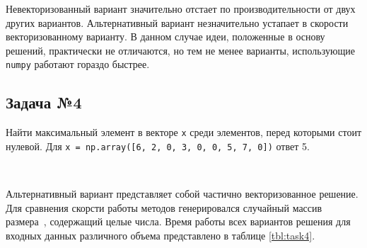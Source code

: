 \documentclass{article}
\begin{document}
\analysis

Невекторизованный вариант значительно отстает по производительности от двух других вариантов. 
Альтернативный  вариант незначительно устапает в скорости векторизованному варианту.
В данном случае идеи, положенные в основу решений, практически не отличаются, но тем не менее
варианты, использующие \verb"numpy" работают гораздо быстрее.

\subsection{Задача №4}

\taskdesc
Найти максимальный элемент в векторе \verb"x" среди элементов, перед которыми стоит нулевой. Для 
\verb"x = np.array([6, 2, 0, 3, 0, 0, 5, 7, 0])" ответ 5.

\soldesc\\
\begin{minipage}{\linewidth}

\end{minipage}
\begin{minipage}{\linewidth}

\end{minipage}
\begin{minipage}{\linewidth}

\end{minipage}

Альтернативный вариант представляет собой частично векторизованное решение.
\testing
Для сравнения скорсти работы методов генерировался случайный массив размера~, содержащий 
целые числа.
Время работы всех вариантов решения для входных данных различного объема представлено в таблице \ref{tbl:task4}.
\end{document}
